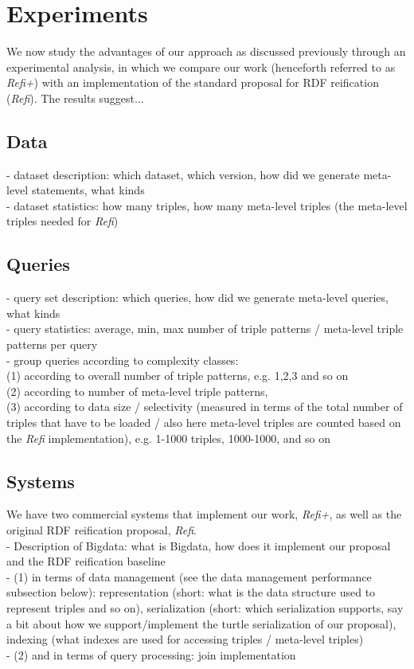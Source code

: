 \section{Experiments}
We now study the advantages of our approach as discussed previously through an experimental analysis, in which we compare our work (henceforth referred to as \emph{Refi+}) with an implementation of the standard proposal for RDF reification (\emph{Refi}). The results suggest... 

\subsection{Data}
-	dataset description: which dataset, which version, how did we generate meta-level statements, what kinds\\
- dataset statistics: how many triples, how many meta-level triples (the meta-level triples needed for \emph{Refi}) \\

\subsection{Queries}
-	query set description: which queries, how did we generate meta-level queries, what kinds\\
- query statistics: average, min, max number of triple patterns / meta-level triple patterns per query\\
- group queries according to complexity classes:\\
(1) according to overall number of triple patterns, e.g. 1,2,3 and so on \\
(2) according to number of meta-level triple patterns, \\
(3) according to data size / selectivity (measured in terms of the total number of triples that have to be loaded / also here meta-level triples are counted based on the \emph{Refi} implementation), e.g. 1-1000 triples, 1000-1000, and so on\\

\subsection{Systems}
We have two commercial systems that implement our work, \emph{Refi+}, as well as the original RDF reification proposal, \emph{Refi}.\\

- Description of Bigdata: what is Bigdata, how does it implement our proposal and the RDF reification baseline\\
- (1) in terms of data management (see the data management performance subsection below): representation (short: what is the data structure used to represent triples and so on), serialization (short: which serialization supports, say a bit about how we support/implement the turtle serialization of our proposal), indexing (what indexes are used for accessing triples /  meta-level triples)\\
- (2) and in terms of query processing: join implementation\\

